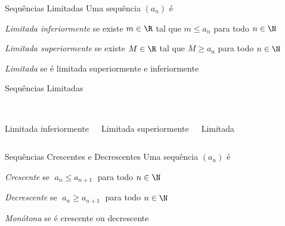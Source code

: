\begin{frame}{Sequências Limitadas}
	Uma sequência $(a_n)$ é

	\vspace{\baselineskip}
	\emph{Limitada inferiormente} \tabto{50mm} se existe $m\in\R$ tal que \emph{$m\leq a_n$} para todo $n\in\N$

	\pause
	\vspace{\baselineskip}
	\emph{Limitada superiormente} \tabto{50mm} se existe $M\in\R$ tal que \emph{$M\geq a_n$} para todo $n\in\N$

	\pause
	\vspace{\baselineskip}
	\emph{Limitada}               \tabto{50mm} se é limitada superiormente e inferiormente

\end{frame}

\begin{frame}{Sequências Limitadas}
\begin{columns}
  \begin{center}
    \scalebox{0.9}{} \\[5mm]
    Limitada inferiormente
  \end{center}
  \begin{center}
    \scalebox{0.9}{} \\[5mm]
    Limitada superiormente
  \end{center}
  \begin{center}
    \scalebox{0.9}{} \\[5mm]
    Limitada
  \end{center}
\end{columns}
\end{frame}

\begin{frame}{Sequências Crescentes e Decrescentes}
	Uma sequência $(a_n)$ é

	\vspace{\baselineskip}
	\emph{Crescente}   \tabto{30mm} se \emph{$\;a_n \leq a_{n+1}\;$} para todo $n\in\N$

	\pause
	\vspace{\baselineskip}
	\emph{Decrescente} \tabto{30mm} se \emph{$\;a_n \geq a_{n+1}\;$} para todo $n\in\N$

	\pause
	\vspace{\baselineskip}
	\emph{Monótona}    \tabto{30mm} se é crescente ou decrescente
\end{frame}


